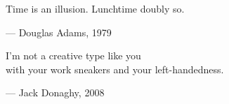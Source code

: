 \begin{flushright}
\begin{hangleftquote}{\QENOpen}{\QENClose}
Time is an illusion. Lunchtime doubly so.
\end{hangleftquote}
\par\smallskip
\normalfont — Douglas Adams, 1979
\end{flushright}
\vspace{2em}
\begin{flushright}
\begin{hangleftquote}{\QENOpen}{\QENClose}
I'm not a creative type like you\\
with your work sneakers and your left-handedness.
\end{hangleftquote}
\par\smallskip
\normalfont — Jack Donaghy, 2008
\end{flushright}
